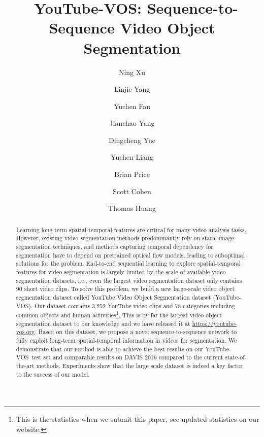 \documentclass[runningheads]{llncs}
\makeatletter
\newcommand{\dataset}{YouTube-VOS}
\DeclareRobustCommand\onedot{\futurelet\@let@token\@onedot}
\def\@onedot{\ifx\@let@token.\else.\null\fi\xspace}
\def\etal{\emph{et al}\onedot}
\makeatother
\begin{document}
\title{~\dataset: Sequence-to-Sequence Video Object Segmentation} 

\titlerunning{~\dataset}

\author{Ning Xu \and
Linjie Yang \and
Yuchen Fan\and
Jianchao Yang\and
Dingcheng Yue \and
Yuchen Liang \and
Brian Price \and
Scott Cohen \and
Thomas Huang}

\authorrunning{N. Xu~\etal}







\maketitle

\begin{abstract}
Learning long-term spatial-temporal features are critical for many video analysis tasks. However, existing video segmentation methods predominantly rely on static image segmentation techniques, and methods capturing temporal dependency for segmentation have to depend on pretrained optical flow models, leading to suboptimal solutions for the problem. End-to-end sequential learning to explore spatial-temporal features for video segmentation is largely limited by the scale of available video segmentation datasets, i.e., even the largest video segmentation dataset only contains 90 short video clips. To solve this problem, we build a new large-scale video object segmentation dataset called YouTube Video Object Segmentation dataset (\dataset). Our dataset contains 3,252 YouTube video clips and 78 categories including common objects and human activities\footnote{This is the statistics when we submit this paper, see updated statistics on our website.}. This is by far the largest video object segmentation dataset to our knowledge and we have released it at \href{https://youtube-vos.org}{https://youtube-vos.org}. Based on this dataset, we propose a novel sequence-to-sequence network to fully exploit long-term spatial-temporal information in videos for segmentation. We demonstrate that our method is able to achieve the best results on our \dataset~test set and comparable results on DAVIS 2016 compared to the current state-of-the-art methods. Experiments show that the large scale dataset is indeed a key factor to the success of our model.

\end{abstract}
\end{document}
